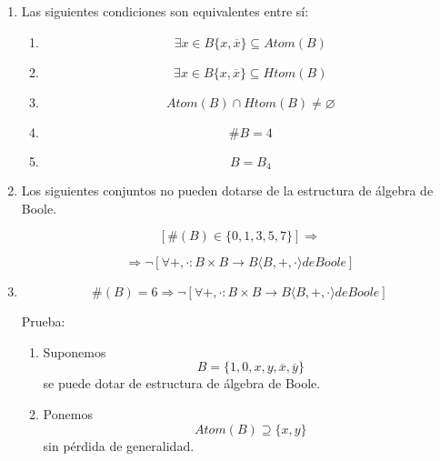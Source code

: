 \documentclass[
]{article}
\providecommand{\tightlist}{%
  \setlength{\itemsep}{0pt}\setlength{\parskip}{0pt}}
\begin{document}
\begin{enumerate}
\begin{enumerate}
\begin{enumerate}
\begin{enumerate}
        \[\varphi:{B\rightarrow B}'::x\mapsto\varphi{(x)} ≔ \begin{Bmatrix}
        {0'\Leftarrow{x = 0}} \\
        {1'\Leftarrow{x = 1}} \\
        {a'\Leftarrow{x = a}} \\
        {\overline{a'}\Leftarrow{x = \overline{a}}}
        \end{Bmatrix}\]
      \end{enumerate}
    \item
      Las siguientes condiciones son equivalentes entre sí:

      \begin{enumerate}
      \def\labelenumiv{\arabic{enumiv}.}
      \tightlist
      \item
        \[\exists{x \in B}{{\{{x,\overline{x}}\}} \subseteq {\mathit{Atom}{(B)}}}\]
      \item
        \[\exists{x \in B}{{\{{x,\overline{x}}\}} \subseteq {\mathit{Htom}{(B)}}}\]
      \item
        \[\mathit{Atom}{{(B)} \cap \mathit{Htom}}{{(B)} \neq \varnothing}\]
      \item
        \[\#{B = 4}\]
      \item
        \[B = B_{4}\]
      \end{enumerate}
    \item
      Los siguientes conjuntos no pueden dotarse de la estructura de
      álgebra de Boole.

      \[\left\lbrack {{\#{(B)}} \in {\{{0,1,3,5,7}\}}} \right\rbrack\Rightarrow\]

      \[\Rightarrow{\neg\left\lbrack {\forall + , \cdot :{{B \times B}\rightarrow B}{\langle{B, + , \cdot}\rangle}\mathit{de}\mathit{Boole}} \right\rbrack}\]
    \item
      \[{{\#{(B)}} = 6}\Rightarrow{\neg\left\lbrack {\forall + , \cdot :{{B \times B}\rightarrow B}{\langle{B, + , \cdot}\rangle}\mathit{de}\mathit{Boole}} \right\rbrack}\]

      Prueba:

      \begin{enumerate}
      \def\labelenumiv{\arabic{enumiv}.}
      \item
        Suponemos\[B = {\{{1,0,x,y,\overline{x},\overline{y}}\}}\]se
        puede dotar de estructura de álgebra de Boole.
      \item
        Ponemos\[\mathit{Atom}{{(B)} \supseteq {\{{x,y}\}}}\] sin
        pérdida de generalidad.


\end{enumerate}
\end{enumerate}
\end{enumerate}
\end{enumerate}
\end{document}
